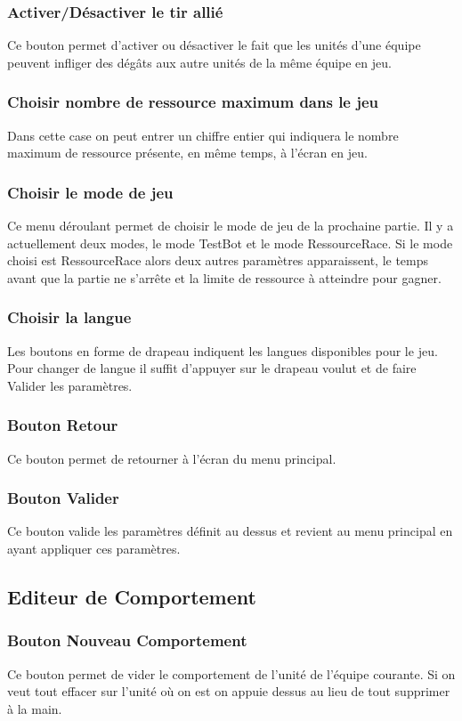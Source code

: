 \documentclass{report}
\begin{document}
\subsubsection{Activer/Désactiver le tir allié}
Ce bouton permet d'activer ou désactiver le fait que les unités d'une équipe peuvent infliger des dégâts aux autre unités de la même équipe en jeu.
\subsubsection{Choisir nombre de ressource maximum dans le jeu}
Dans cette case on peut entrer un chiffre entier qui indiquera le nombre maximum de ressource présente, en même temps, à l'écran en jeu.
\subsubsection{Choisir le mode de jeu}
Ce menu déroulant permet de choisir le mode de jeu de la prochaine partie. Il y a actuellement deux modes, le mode TestBot et le mode RessourceRace. Si le mode choisi est RessourceRace alors deux autres paramètres apparaissent, le temps avant que la partie ne s’arrête et la limite de ressource à atteindre pour gagner.
\subsubsection{Choisir la langue}
Les boutons en forme de drapeau indiquent les langues disponibles pour le jeu. Pour changer de langue il suffit d'appuyer sur le drapeau voulut et de faire Valider les paramètres.
\subsubsection{Bouton Retour}
Ce bouton permet de retourner à l'écran du menu principal.
\subsubsection{Bouton Valider}
Ce bouton valide les paramètres définit au dessus et revient au menu principal en ayant appliquer ces paramètres.

\subsection{Editeur de Comportement}
\subsubsection{Bouton Nouveau Comportement}
Ce bouton permet de vider le comportement de l'unité de l'équipe courante. Si on veut tout effacer sur l'unité où on est on appuie dessus au lieu de tout supprimer à la main.
\end{document}
